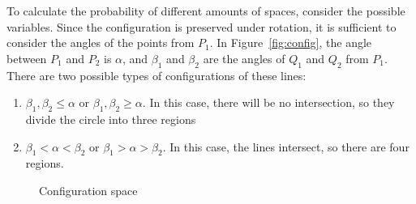 \documentclass[twocolumn]{article}
\begin{document}
To calculate the probability of different amounts of spaces, consider the possible variables.
Since the configuration is preserved under rotation, it is sufficient to consider the
angles of the points from $P_1$. In Figure~\ref{fig:config}, the angle between 
$P_1$ and $P_2$ is $\alpha$, and $\beta_1$ and $\beta_2$ are the angles of $Q_1$
and $Q_2$ from $P_1$. There are two possible types of configurations of these lines:

\begin{enumerate}
    \item $\beta_1, \beta_2 \le \alpha$ or $\beta_1, \beta_2 \ge \alpha$.
          In this case, there will be no intersection, so they divide the circle into three regions
    \item $\beta_1 < \alpha < \beta_2$ or $\beta_1 > \alpha > \beta_2$.
          In this case, the lines intersect, so there are four regions.
\end{enumerate}

\begin{figure}[h]
    \centering
    \caption{Configuration space}
    \label{fig:space}
    \begin{tikzpicture}[scale=2,>=latex]
        
    \end{tikzpicture}
\end{figure}
\end{document}
